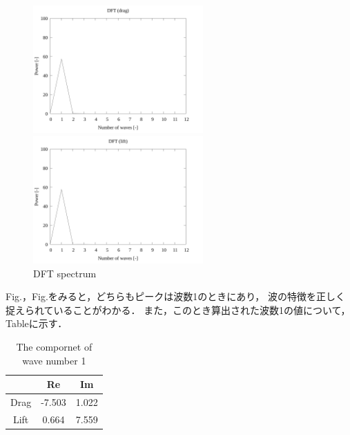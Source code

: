 \begin{figure}
  \begin{minipage}[b]{0.45\linewidth}
    \centering
    \includegraphics[width=65mm]{../../02_workspace/result/2-ex/plot/07/07-3_dft-drag.png}
  \end{minipage}
  \begin{minipage}[b]{0.45\linewidth}
    \centering
    \includegraphics[width=65mm]{../../02_workspace/result/2-ex/plot/07/07-4_dft-lift.png}
  \end{minipage}
  \caption{DFT spectrum}
\end{figure}

Fig.，Fig.をみると，どちらもピークは波数1のときにあり，
波の特徴を正しく捉えられていることがわかる．
また，このとき算出された波数1の値について，Tableに示す．

\begin{table}[htbp]
  \begin{center}
    \caption{The compornet of wave number 1}
    \begin{tabular}{|p{30mm}|p{20mm}|p{20mm}|}
      \hline
      \multicolumn{1}{|c|}{}     & \multicolumn{1}{|c|}{Re}     & \multicolumn{1}{|c|}{Im}    \\ \hline
      \multicolumn{1}{|c|}{Drag} & \multicolumn{1}{|c|}{-7.503} & \multicolumn{1}{|c|}{1.022} \\ \hline
      \multicolumn{1}{|c|}{Lift} & \multicolumn{1}{|c|}{0.664}  & \multicolumn{1}{|c|}{7.559} \\ \hline
    \end{tabular}
  \end{center}
\end{table}

